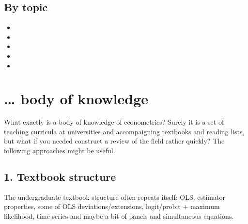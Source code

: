 \documentclass[letterpaper,10pt,english]{sphinxmanual}
\begin{document}
\subsection{By topic}
\label{\detokenize{textbook/history:by-topic}}\begin{itemize}
\item {} 

\item {} 

\item {} 

\item {} 

\item {} 

\end{itemize}


\section{… body of knowledge}
\label{\detokenize{textbook/ways-into-econometrics:body-of-knowledge}}\label{\detokenize{textbook/ways-into-econometrics::doc}}
What exactly is a body of knowledge of econometrics? Surely it is a set of
teaching curricula at universities and accompaigning textbooks and reading lists,
but what if you needed construct a review of the field rather quickly?
The following approaches might be useful.


\subsection{1. Textbook structure}
\label{\detokenize{textbook/ways-into-econometrics:textbook-structure}}
The undergraduate textbook structure often repeats itself: OLS, estimator
properties, some of OLS deviations/extensions, logit/probit + maximum likelihood,
time series and maybe a bit of panels and simultaneous equations.
\end{document}
